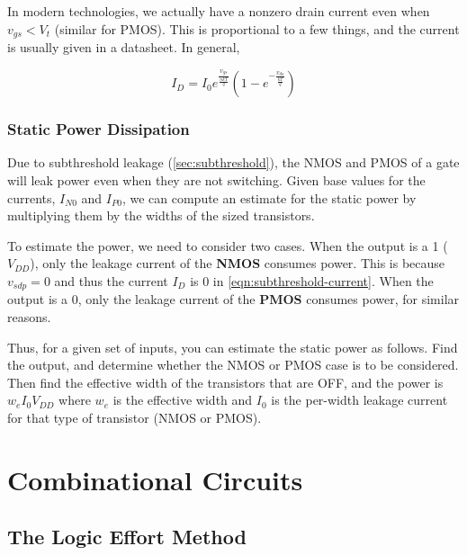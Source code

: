 \documentclass[11pt]{report}
\begin{document}
In modern technologies, we actually have a nonzero drain current even when $v_{gs} < V_t$ (similar for PMOS). This is proportional to a few things, and the current is usually given in a datasheet. In general,

\begin{equation}
	\label{eqn:subthreshold-current}
	I_D = I_0 e^{\frac{v_{gs}}{\frac{nkT}{q}}}	\left(1 - e^{-\frac{v_{ds}}{\frac{kT}{q}}}\right)
\end{equation}


\subsection{Static Power Dissipation}
Due to subthreshold leakage (\autoref{sec:subthreshold}), the NMOS and PMOS of a gate will leak power even when they are not switching. Given base values for the currents, $I_{N0}$ and $I_{P0}$, we can compute an estimate for the static power by multiplying them by the widths of the sized transistors.

To estimate the power, we need to consider two cases. When the output is a 1 ($V_{DD}$), only the leakage current of the \textbf{NMOS} consumes power. This is because $v_{sdp} = 0$ and thus the current $I_{D}$ is 0 in \autoref{eqn:subthreshold-current}. When the output is a 0, only the leakage current of the \textbf{PMOS} consumes power, for similar reasons.


Thus, for a given set of inputs, you can estimate the static power as follows. Find the output, and determine whether the NMOS or PMOS case is to be considered. Then find the effective width of the transistors that are OFF, and the power is $w_eI_0V_{DD}$ where $w_e$ is the effective width and $I_0$ is the per-width leakage current for that type of transistor (NMOS or PMOS).


\chapter{Combinational Circuits}
\section{The Logic Effort Method}
\end{document}
